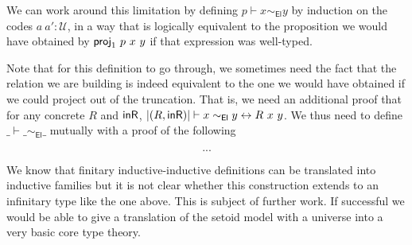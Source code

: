 \documentclass{easychair}
\newcommand{\setoidU}{\mathcal{U}}
\newcommand{\ad}[1]{\AgdaFunction{#1}}
\newcommand{\El}{\textsf{El}}
\renewcommand{\iff}{\leftrightarrow}
\begin{document}
We can work around this limitation by defining $p \vdash x \sim_{\El} y$ by
induction on the codes $a\ a' : \setoidU$, in a way that is logically equivalent
to the proposition we would have obtained by $\ad{proj}_1\ p\ x\ y$ if that
expression was well-typed.

Note that for this definition to go through, we sometimes need the fact that the
relation we are building is indeed equivalent to the one we would have obtained
if we could project out of the truncation. That is, we need an additional proof
that for any concrete $R$ and $\ad{inR}$, $| (R, \ad{inR}) | \vdash x \sim_{\El}
y \iff R\ x\ y$. We thus need to define $\_\vdash\_\sim_{\El}\_$ mutually with a proof
of the following

\[
...
\]

We know that finitary inductive-inductive definitions can be translated into
inductive families \cite{iit-erasure,iit-to-ix,induction-is-enough} but it is
not clear whether this construction extends to an infinitary type like the one
above. This is subject of further work. If successful we would be able to give a
translation of the setoid model with a universe into a very basic core type
theory.



\end{document}
